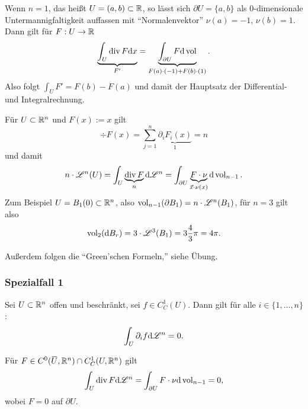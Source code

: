 \begin{rmrk}
 Wenn $n=1$, das heißt $U = (a,b) \subset \mathbb{R}$, so lässt sich $\partial U = \{ a,b \}$ als 0-dimensionale Untermannigfaltigkeit auffassen mit ``Normalenvektor'' $\nu(a) = -1$, $\nu(b) = 1$. Dann gilt für $F: U \to \mathbb{R}$
 \[ \underbrace{\int_U \operatorname{div} F \mathrm{d} x}_{F'} = \underbrace{\int_{\partial U} F \mathrm{d} \operatorname{vol}}_{F(a)\cdot(-1)+F(b)\cdot(1)}. \]
 Also folgt $\int_U F' = F(b) - F(a)$ und damit der Hauptsatz der Differential- und Integralrechnung. 
\end{rmrk}

\begin{folg}
 Für $U \subset \mathbb{R}^n$ und $F(x) := x$ gilt 
 \[ \div F(x) = \sum_{j=1}^n \underbrace{\partial_i F_i(x)}_1 = n \]
 und damit
 \[ n \cdot \mathscr{L}^n (U) = \int_U \underbrace{\operatorname{div} F}_n \mathrm{d} \mathscr{L}^n = \int_{\partial U} \underbrace{F \cdot \nu}_{\vec{x} \cdot \nu(x)} \mathrm{d} \operatorname{vol}_{n-1}. \]
 Zum Beispiel $U = B_1(0) \subset \mathbb{R}^n$, also $\operatorname{vol}_{n-1}( \partial B_1 ) = n \cdot \mathscr{L}^n (B_1)$, für $n = 3$ gilt also 
 \[ \operatorname{vol}_2 (\mathrm{d} B_r) = 3 \cdot \mathscr{L}^3 (B_1) = 3 \frac{4}{3} \pi = 4 \pi. \]
 
 Außerdem folgen die ``Green'schen Formeln,'' siehe Übung.
\end{folg}

\subsubsection{Spezialfall 1}
\begin{thm}
 Sei $U \subset \mathbb{R}^n$ offen und beschränkt, sei $f \in C^1_C(U)$. Dann gilt für alle $i \in \{ 1, \ldots, n \}$:
 \[ \int_U \partial_i f \mathrm{d} \mathscr{L}^n = 0. \]
\end{thm}

\begin{folg}
 Für $F \in C^0(\obar{U}, \real^n) \cap C_C^1(U, \real^n)$ gilt
 \[ \int_U \operatorname{div} F \mathrm{d} \mathscr{L}^n = \int_{\partial U} F \cdot \nu \mathrm{d} \operatorname{vol}_{n-1} = 0, \]
 wobei $F = 0$ auf $\partial U$.
\end{folg}

